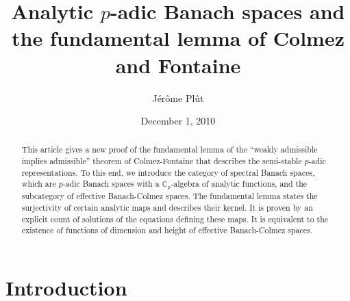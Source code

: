 \documentclass{article}
\makeatletter
\theoremstyle{definition}
\def\makecompact#1{\g@addto@macro#1{%
  \setlength{\itemsep}{\z@}\setlength{\parsep}{\z@}%
  \setlength{\topsep}{\z@}\setlength{\partopsep}{\z@}%
}}
\def\Cp{{ℂ_p}}
\makeatother
\begin{document}
\makecompact\itemize
\makecompact\enumerate

\title{Analytic $p$-adic Banach spaces and the fundamental lemma of
Colmez and Fontaine}
\date{December 1, 2010}
\author{Jérôme Plût}
\maketitle

\begin{abstract}%
This article gives a new proof of the fundamental lemma of the ``weakly
admissible implies admissible'' theorem of Colmez-Fontaine that describes
the semi-stable $p$-adic representations. To this end, we introduce the
category of spectral Banach spaces, which are $p$-adic Banach spaces with
a $\Cp$-algebra of analytic functions, and the subcategory of effective
Banach-Colmez spaces. The fundamental lemma states the surjectivity of
certain analytic maps and describes their kernel. It is proven by an
explicit count of solutions of the equations defining these maps. It is
equivalent to the existence of functions of dimension and height of
effective Banach-Colmez spaces.
\end{abstract}%
\section*{Introduction}
\end{document}
